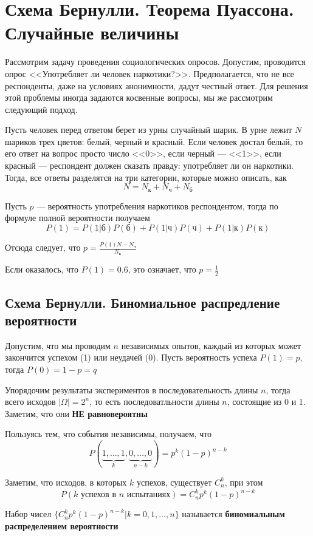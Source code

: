 \documentclass[a4paper, 10pt]{article}
\begin{document}
\section{Схема Бернулли. Теорема Пуассона. Случайные величины}
Рассмотрим задачу проведения социологических опросов. Допустим, проводится опрос <<Употребляет ли человек наркотики?>>. Предполагается, что не все респонденты, даже на условиях анонимности, дадут честный ответ. Для решения этой проблемы иногда задаются косвенные вопросы, мы же рассмотрим следующий подход.

Пусть человек перед ответом берет из урны случайный шарик. В урне лежит $N$ шариков трех цветов: белый, черный и красный. Если человек достал белый, то его ответ на вопрос просто число <<0>>, если черный — <<1>>, если красный — респондент должен сказать правду: употребляет ли он наркотики. Тогда, все ответы разделятся на три категории, которые можно описать, как
$$N=N_\text{к}+N_{\text{ч}}+N_{\text{б}}$$

Пусть $p$ — вероятность употребления наркотиков респондентом, тогда по формуле полной вероятности получаем
$$P(1)=P(1|\text{б})P(\text{б})+P(1|\text{ч})P(\text{ч})+P(1|\text{к})P(\text{к})$$

Отсюда следует, что $p=\displaystyle\frac{P(1)N-N_{\text{ч}}}{N_{\text{к}}}$

\ex Если оказалось, что $P(1)=0.6$, это означает, что $p=\frac{1}{2}$

\subsection{Схема Бернулли. Биномиальное распредление вероятности}
Допустим, что мы проводим $n$ независимых опытов, каждый из которых может закончится успехом (1) или неудачей (0). Пусть вероятность успеха $P(1)=p$, тогда $P(0)=1-p=q$

Упорядочим результаты экспериментов в последовательность длины $n$, тогда всего исходов $|\Omega|=2^n$, то есть последоватльности длины $n$, состоящие из 0 и 1. Заметим, что они \textbf{НЕ равновероятны}

Пользуясь тем, что события независимы, получаем, что $$P(\underbrace{1,\ldots,1}_{k},\underbrace{0,\ldots,0}_{n-k})=p^k(1-p)^{n-k}$$

Заметим, что исходов, в которых $k$ успехов, существует $C_n^k$, при этом
$$P(\text{$k$ успехов в $n$ испытаниях})=C_n^k p^k(1-p)^{n-k}$$

 Набор чисел $\{C_n^k p^k(1-p)^{n-k}|k=0,1,\ldots,n\}$ называется \textbf{биномиальным распределением вероятности}
\end{document}
